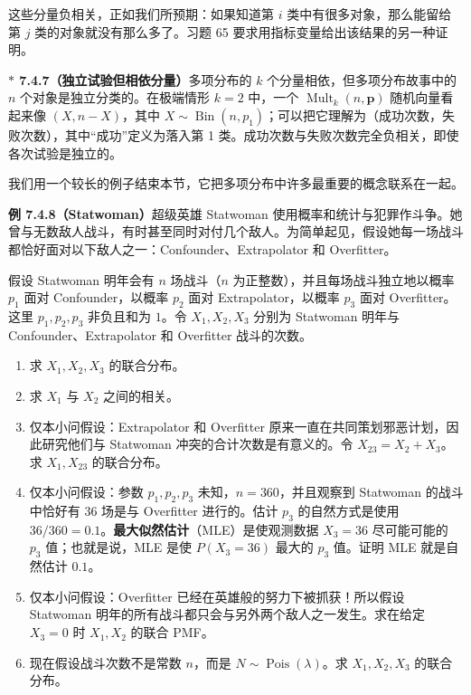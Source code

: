 \documentclass[UTF8, 12pt, fontset=fandol, oneside]{ctexart}
\newcommand{\biohazard}{\ensuremath{\ast}}
\begin{document}
这些分量负相关，正如我们所预期：如果知道第 $i$ 类中有很多对象，那么能留给第 $j$ 类的对象就没有那么多了。习题 65 要求用指标变量给出该结果的另一种证明。

\noindent\textbf{$\biohazard$ 7.4.7（独立试验但相依分量）}\quad 多项分布的 $k$ 个分量相依，但多项分布故事中的 $n$ 个对象是独立分类的。在极端情形 $k=2$ 中，一个 $\operatorname{Mult}_k(n,\mathbf{p})$ 随机向量看起来像 $(X,n-X)$，其中 $X\sim \operatorname{Bin}(n,p_1)$；可以把它理解为（成功次数，失败次数），其中“成功”定义为落入第 1 类。成功次数与失败次数完全负相关，即使各次试验是独立的。

我们用一个较长的例子结束本节，它把多项分布中许多最重要的概念联系在一起。

\noindent\textbf{例 7.4.8（Statwoman）}\quad 超级英雄 Statwoman 使用概率和统计与犯罪作斗争。她曾与无数敌人战斗，有时甚至同时对付几个敌人。为简单起见，假设她每一场战斗都恰好面对以下敌人之一：Confounder、Extrapolator 和 Overfitter。

假设 Statwoman 明年会有 $n$ 场战斗（$n$ 为正整数），并且每场战斗独立地以概率 $p_1$ 面对 Confounder，以概率 $p_2$ 面对 Extrapolator，以概率 $p_3$ 面对 Overfitter。这里 $p_1,p_2,p_3$ 非负且和为 $1$。令 $X_1,X_2,X_3$ 分别为 Statwoman 明年与 Confounder、Extrapolator 和 Overfitter 战斗的次数。

\begin{enumerate}
  \item[(a)] 求 $X_1,X_2,X_3$ 的联合分布。
  \item[(b)] 求 $X_1$ 与 $X_2$ 之间的相关。
  \item[(c)] 仅本小问假设：Extrapolator 和 Overfitter 原来一直在共同策划邪恶计划，因此研究他们与 Statwoman 冲突的合计次数是有意义的。令 $X_{23}=X_2+X_3$。求 $X_1,X_{23}$ 的联合分布。
  \item[(d)] 仅本小问假设：参数 $p_1,p_2,p_3$ 未知，$n=360$，并且观察到 Statwoman 的战斗中恰好有 36 场是与 Overfitter 进行的。估计 $p_3$ 的自然方式是使用 $36/360=0.1$。\textbf{最大似然估计}（MLE）是使观测数据 $X_3=36$ 尽可能可能的 $p_3$ 值；也就是说，MLE 是使 $P(X_3=36)$ 最大的 $p_3$ 值。证明 MLE 就是自然估计 $0.1$。
  \item[(e)] 仅本小问假设：Overfitter 已经在英雄般的努力下被抓获！所以假设 Statwoman 明年的所有战斗都只会与另外两个敌人之一发生。求在给定 $X_3=0$ 时 $X_1,X_2$ 的联合 PMF。
  \item[(f)] 现在假设战斗次数不是常数 $n$，而是 $N\sim \operatorname{Pois}(\lambda)$。求 $X_1,X_2,X_3$ 的联合分布。
\end{enumerate}
\end{document}
